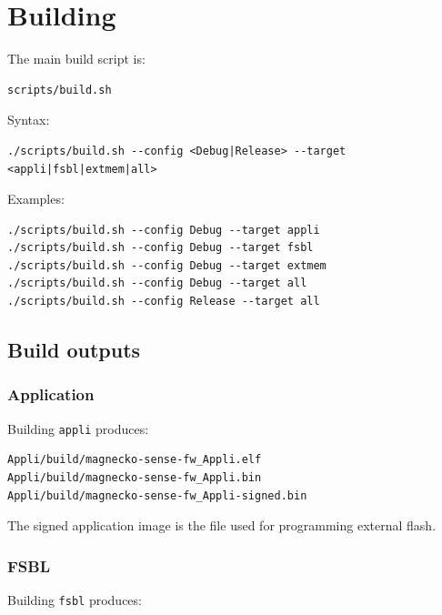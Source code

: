 \documentclass[10pt,a4paper,oneside]{report}
\begin{document}
\section{Building}\label{wiki-getting-started-build-flash-debug--2-building}

The main build script is:

\begin{verbatim}
scripts/build.sh
\end{verbatim}

Syntax:

\begin{verbatim}
./scripts/build.sh --config <Debug|Release> --target <appli|fsbl|extmem|all>
\end{verbatim}

Examples:

\begin{verbatim}
./scripts/build.sh --config Debug --target appli
./scripts/build.sh --config Debug --target fsbl
./scripts/build.sh --config Debug --target extmem
./scripts/build.sh --config Debug --target all
./scripts/build.sh --config Release --target all
\end{verbatim}

\subsection{Build outputs}\label{wiki-getting-started-build-flash-debug--build-outputs}

\subsubsection{Application}\label{wiki-getting-started-build-flash-debug--application}

Building \texttt{appli} produces:

\begin{verbatim}
Appli/build/magnecko-sense-fw_Appli.elf
Appli/build/magnecko-sense-fw_Appli.bin
Appli/build/magnecko-sense-fw_Appli-signed.bin
\end{verbatim}

The signed application image is the file used for programming external flash.

\subsubsection{FSBL}\label{wiki-getting-started-build-flash-debug--fsbl}

Building \texttt{fsbl} produces:
\end{document}
